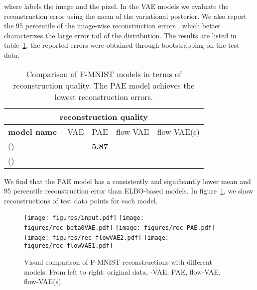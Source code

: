 \documentclass[10pt]{article} \usepackage[accepted]{tmlr}
\newcommand{\rev}[1]{{\color{black}#1}}
\begin{document}
where  labels the image and  the pixel. \rev{In the VAE models we evaluate the reconstruction error using the mean of the variational posterior}. We also report the 95 percentile of the image-wise reconstruction errors , which better characterizes the large error tail of the distribution. The results are listed in table~\ref{tab:recons}, the reported errors were obtained through bootstrapping on the test data.
\begin{table}[h]
\begin{center}
\begin{tabular}{lllll}
\multicolumn{5}{c}{\textbf{reconstruction quality}}                                                                                   \\ \hline
\multicolumn{1}{c|}{\textbf{model name}}   & \multicolumn{1}{c|}{-VAE} & \multicolumn{1}{c|}{PAE}         & \multicolumn{1}{c|}{flow-VAE} & \multicolumn{1}{c}{flow-VAE(s)} \\ \hline
\multicolumn{1}{l|}{  ()} & \multicolumn{1}{l|}{}       & \multicolumn{1}{l|}{\textbf{5.87}}& \multicolumn{1}{l|}{} &             \\
\multicolumn{1}{l|}{  ()} & \multicolumn{1}{l|}{}       & \multicolumn{1}{l|}{} &  \multicolumn{1}{l|}{} &   \\
\end{tabular}
\end{center}
\caption{\label{tab:recons} Comparison of F-MNIST models in terms of reconstruction quality. The PAE model achieves the lowest reconstruction errors.}
\end{table}

We find that the PAE model has a consistently and significantly lower mean and 95 percentile reconstruction error than ELBO-based models. In figure~\ref{fig:reconstructions}, we show reconstructions of test data points for each model. \begin{figure}
\texttt{[image: figures/input.pdf]}
\texttt{[image: figures/rec\_beta0VAE.pdf]}
\texttt{[image: figures/rec\_PAE.pdf]}
\texttt{[image: figures/rec\_flowVAE2.pdf]}
\texttt{[image: figures/rec\_flowVAE1.pdf]}
\caption{Visual comparison of F-MNIST reconstructions with different models. From left to right: original data, -VAE, PAE, flow-VAE, flow-VAE(s).}
\label{fig:reconstructions}
\end{figure}
\end{document}
